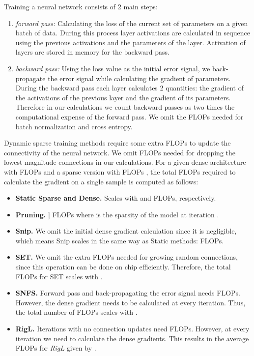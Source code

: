 \documentclass{article}
\begin{document}
Training a neural network consists of 2 main steps:
\begin{enumerate}
    \item \textit{forward pass:} Calculating the loss of the current set of parameters on a given batch of data. During this process layer activations are calculated in sequence using the previous activations and the parameters of the layer. Activation of layers are stored in memory for the backward pass.
    \item \textit{backward pass:} Using the loss value as the initial error signal, we back-propagate the error signal while calculating the gradient of parameters. During the backward pass each layer calculates 2 quantities: the gradient of the activations of the previous layer and the gradient of its parameters. Therefore in our calculations we count backward passes as two times the computational expense of the forward pass. We omit the FLOPs needed for batch normalization and cross entropy.
\end{enumerate}

Dynamic sparse training methods require some extra FLOPs to update the connectivity of the neural network. We omit FLOPs needed for dropping the lowest magnitude connections in our calculations. For a given dense architecture with FLOPs  and a sparse version with FLOPs , the total FLOPs required to calculate the gradient on a single sample is computed as follows:
\begin{itemize}
    \item \textbf{Static Sparse and Dense.} Scales with  and  FLOPs, respectively.
    \item \textbf{Pruning.} ]  FLOPs where  is the sparsity of the model at iteration .
    \item \textbf{Snip.} We omit the initial dense gradient calculation since it is negligible, which means Snip scales in the same way as Static methods:   FLOPs.
    \item \textbf{SET.} We omit the extra FLOPs needed for growing random connections, since this operation can be done on chip efficiently. Therefore, the total FLOPs for SET scales with .
    \item \textbf{SNFS.} Forward pass and back-propagating the error signal needs  FLOPs. However, the dense gradient needs to be calculated at every iteration. Thus, the total number of FLOPs scales with .
    \item \textbf{RigL.} Iterations with no connection updates need  FLOPs. However, at every  iteration we need to calculate the dense gradients. This results in the average FLOPs for {\em RigL} given by .
\end{itemize}
\end{document}
